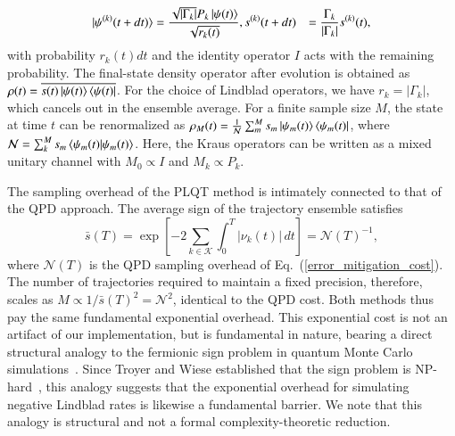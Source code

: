 \documentclass[10pt, superscriptaddress,aps,pra,twocolumn,showpacs,nofootinbib, longbibliography, notitlepage,floatfix]{revtex4-2}
\begin{document}
\begin{equation}
\begin{split}
    \ket{\psi^{(k)}(t + dt)} & = \frac{\sqrt{|\Gamma_k|}P_k \ket{\psi(t)}}{\sqrt{r_k(t)}}, 
    s^{(k)}(t + dt) & = \frac{\Gamma_k}{|\Gamma_k|} s^{(k)}(t),
\end{split}
\end{equation}
with probability $r_k(t) dt$ and the identity operator $I$ acts with the remaining probability. The final-state density operator after evolution is obtained as $\rho(t) = \overline{s(t)\ket{\psi(t)}\bra{\psi(t)}}$. For the choice of Lindblad operators, we have $r_k = {|\Gamma_k|}$, which cancels out in the ensemble average. For a finite sample size $M$, the state at time $t$ can be renormalized as $\rho_{{M}}(t) = \frac{1}{\mathcal{N}} \sum_m^{{M}} s_m \ket{\psi_m(t) } \bra{\psi_m(t) }$, where $\mathcal{N} = \sum_k^{{M}} s_m \braket{\psi_m(t) | \psi_m(t)}$. Here, the Kraus operators can be written as a mixed unitary channel with $M_0 \propto I$ and $M_k \propto P_k$. 

{The sampling overhead of the PLQT method is intimately connected to that of the QPD approach. The average sign of the trajectory ensemble 
satisfies~\cite{Eckardt_PRL}
%
\begin{equation}
    \bar{s}(T) 
    = \exp\!\left[-2\sum_{k\in\mathcal{K}}
    \int_0^T|\nu_k(t)|\,dt\right]
    = \mathcal{N}(T)^{-1},
    \label{eq:sign_correspondence}
\end{equation}
%
where $\mathcal{N}(T)$ is the QPD sampling overhead of 
Eq.~(\ref{error_mitigation_cost}). The number of trajectories required to maintain a fixed precision, therefore, scales as $M \propto 1/\bar{s}(T)^2 = \mathcal{N}^2$, identical to the QPD cost. Both methods thus pay the same fundamental exponential overhead. This exponential cost is not an artifact of our implementation, but is fundamental in nature, bearing a direct structural analogy to the fermionic sign problem in quantum Monte Carlo simulations~\cite{Troyer_prl_2005}. Since Troyer and Wiese established that the sign problem is NP-hard~\cite{Troyer_prl_2005}, this analogy suggests that the exponential overhead for simulating negative Lindblad rates is likewise a fundamental barrier. We note that this analogy is structural and not a formal complexity-theoretic reduction.}
\end{document}
